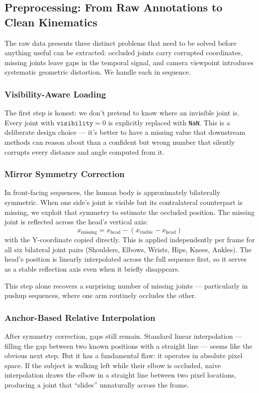 \documentclass[10pt, twocolumn, a4paper]{article}
\begin{document}
\subsection{Preprocessing: From Raw Annotations to Clean Kinematics}
The raw data presents three distinct problems that need to be solved before anything useful can be extracted: occluded joints carry corrupted coordinates, missing joints leave gaps in the temporal signal, and camera viewpoint introduces systematic geometric distortion. We handle each in sequence.

\subsubsection{Visibility-Aware Loading}
The first step is honest: we don't pretend to know where an invisible joint is. Every joint with $\texttt{visibility} = 0$ is explicitly replaced with \texttt{NaN}. This is a deliberate design choice — it's better to have a missing value that downstream methods can reason about than a confident but wrong number that silently corrupts every distance and angle computed from it.

\subsubsection{Mirror Symmetry Correction}
In front-facing sequences, the human body is approximately bilaterally symmetric. When one side's joint is visible but its contralateral counterpart is missing, we exploit that symmetry to estimate the occluded position. The missing joint is reflected across the head's vertical axis:
\begin{equation}
x_{\text{missing}} = x_{\text{head}} - (x_{\text{visible}} - x_{\text{head}})
\end{equation}
with the Y-coordinate copied directly. This is applied independently per frame for all six bilateral joint pairs (Shoulders, Elbows, Wrists, Hips, Knees, Ankles). The head's position is linearly interpolated across the full sequence first, so it serves as a stable reflection axis even when it briefly disappears.

This step alone recovers a surprising number of missing joints — particularly in pushup sequences, where one arm routinely occludes the other.

\subsubsection{Anchor-Based Relative Interpolation}
After symmetry correction, gaps still remain. Standard linear interpolation — filling the gap between two known positions with a straight line — seems like the obvious next step. But it has a fundamental flaw: it operates in absolute pixel space. If the subject is walking left while their elbow is occluded, naive interpolation draws the elbow in a straight line between two pixel locations, producing a joint that ``slides'' unnaturally across the frame.
\end{document}
